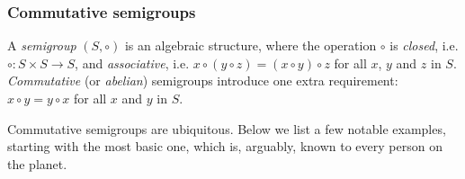 \documentclass[11pt,letterpaper]{article}
\begin{document}
\subsubsection{Commutative semigroups}

A \emph{semigroup} $(S, \circ)$ is an algebraic structure, where the operation
$\circ$ is \emph{closed}, i.e. $\circ : S\times S \rightarrow S$, and
\emph{associative}, i.e.
$x \circ (y \circ z) = (x \circ y) \circ z$ for all $x$, $y$ and $z$ in $S$.
\emph{Commutative} (or \emph{abelian}) semigroups introduce one extra
requirement: $x \circ y = y \circ x$ for all $x$ and $y$ in $S$.

Commutative semigroups are ubiquitous. Below we list a few
notable examples, starting with the most basic one, which is, arguably, known
to every person on the planet.
\end{document}
